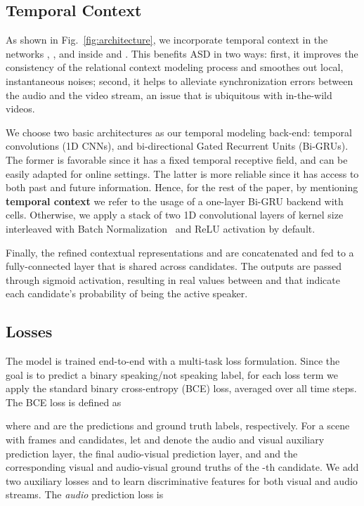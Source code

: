 \documentclass[sigconf]{acmart}
\begin{document}
\begin{CCSXML}
\subsection{Temporal Context}\label{sec:temporal-context}
As shown in Fig.~\ref{fig:architecture}, we incorporate temporal context in the networks , , and  inside  and . This benefits ASD in two ways: first, it improves the consistency of the relational context modeling process and smoothes out local, instantaneous noises; second, it helps to alleviate synchronization errors between the audio and the video stream, an issue that is ubiquitous with in-the-wild videos.

We choose two basic architectures as our temporal modeling back-end: temporal convolutions (1D CNNs), and bi-directional Gated Recurrent Units (Bi-GRUs). The former is favorable since it has a fixed temporal receptive field, and can be easily adapted for online settings. The latter is more reliable since it has access to both past and future information. Hence, for the rest of the paper, by mentioning \textbf{temporal context} we refer to the usage of a one-layer Bi-GRU backend with  cells. Otherwise, we apply a stack of two 1D convolutional layers of kernel size  interleaved with Batch Normalization~\cite{DBLP:conf/icml/IoffeS15} and ReLU activation by default.

Finally, the refined contextual representations  and  are concatenated and fed to a fully-connected layer that is shared across candidates. The outputs are passed through sigmoid activation, resulting in real values between  and  that indicate each candidate's probability of being the active speaker.
\vspace{-2ex}
\subsection{Losses}\label{sec:losses}
The model is trained end-to-end with a multi-task loss formulation. Since the goal is to predict a binary speaking/not speaking label, for each loss term we apply the standard binary cross-entropy (BCE) loss, averaged over all time steps. The BCE loss is defined as

where  and  are the predictions and ground truth labels, respectively. For a scene with  frames and  candidates, let  and  denote the audio and visual auxiliary prediction layer,  the final audio-visual prediction layer, and  and  the corresponding visual and audio-visual ground truths of the -th candidate. We add two auxiliary losses  and  to learn discriminative features for both visual and audio streams. The \textit{audio} prediction loss is


\end{CCSXML}
\end{document}
